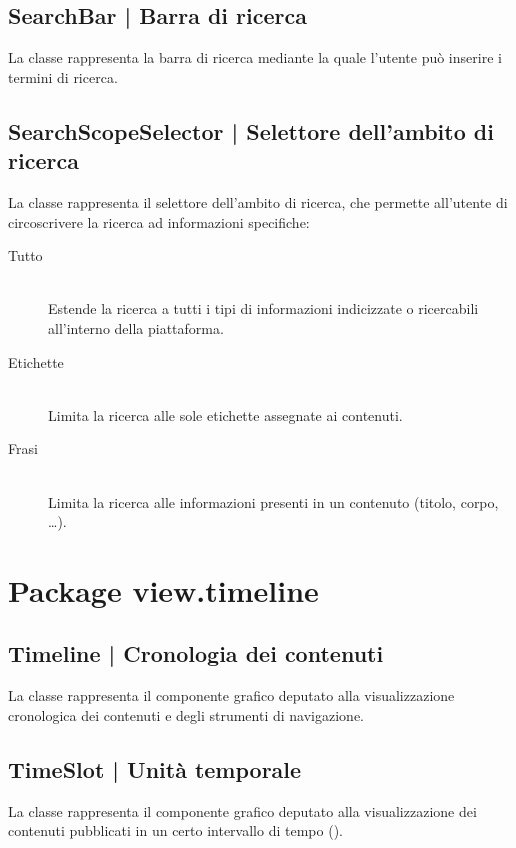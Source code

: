 \documentclass[10pt,a4paper,headinclude,footinclude,hidelinks]{scrreprt} %
\begin{document}
	\subsection[SearchBar]{SearchBar | Barra di ricerca}
	\label{sec:stage:design:sistema:view.search:search-bar}
	La classe \textit{} rappresenta la barra di ricerca mediante la quale l'utente può inserire i termini di ricerca.

	\subsection[SearchScopeSelector]{SearchScopeSelector | Selettore dell'ambito di ricerca}
	\label{sec:stage:design:sistema:view.search:search-scope-selector}
	La classe \textit{} rappresenta il selettore dell'ambito di ricerca, che permette all'utente di circoscrivere la ricerca ad informazioni specifiche:
	\begin{description}
	\item[Tutto] \hfill \\
	Estende la ricerca a tutti i tipi di informazioni indicizzate o ricercabili all'interno della piattaforma.
 	\item[Etichette] \hfill \\
	Limita la ricerca alle sole etichette assegnate ai contenuti.
	\item[Frasi] \hfill \\
	Limita la ricerca alle informazioni presenti in un contenuto (titolo, corpo, \ldots).
	\end{description}

	\section{Package view.timeline}
	\label{sec:stage:design:sistema:view.timeline}

	\subsection[Timeline]{Timeline | Cronologia dei contenuti}
	\label{sec:stage:design:sistema:view.timeline:timeline-view}
	La classe \textit{} rappresenta il componente grafico deputato alla visualizzazione cronologica dei contenuti e degli strumenti di navigazione.

	\subsection[TimeSlot]{TimeSlot | Unità temporale}
	\label{sec:stage:design:sistema:view.timeline:time-slot}
	La classe \textit{} rappresenta il componente grafico deputato alla visualizzazione dei contenuti pubblicati in un certo intervallo di tempo (\textit{}).
\end{document}
